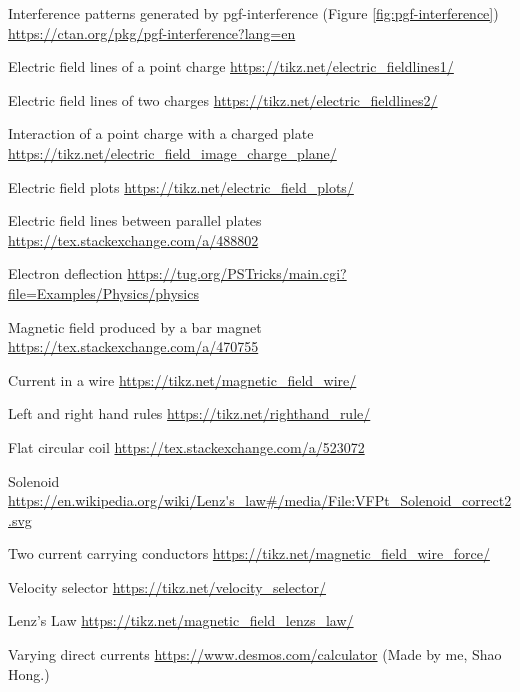 \begin{enumerate}[label={[\arabic*]}]
    \item\label{source:pgf-interference} Interference patterns generated by pgf-interference (Figure \ref{fig:pgf-interference}) \url{https://ctan.org/pkg/pgf-interference?lang=en}
    \item\label{Electric field lines of a point charge} Electric field lines of a point charge \url{https://tikz.net/electric_fieldlines1/}
    \item\label{Electric field lines of two charges} Electric field lines of two charges \url{https://tikz.net/electric_fieldlines2/}
    \item\label{Interaction of a point charge with a charged plate} Interaction of a point charge with a charged plate \url{https://tikz.net/electric_field_image_charge_plane/}
    \item\label{Electric field plots} Electric field plots \url{https://tikz.net/electric_field_plots/}
    \item\label{Electric field lines between parallel plates} Electric field lines between parallel plates \url{https://tex.stackexchange.com/a/488802}
    \item\label{Electron deflection} Electron deflection \url{https://tug.org/PSTricks/main.cgi?file=Examples/Physics/physics}
    \item\label{Magnetic field produced by a bar magnet} Magnetic field produced by a bar magnet \url{https://tex.stackexchange.com/a/470755} 
    \item\label{Current in a wire} Current in a wire \url{https://tikz.net/magnetic_field_wire/}
    \item\label{Left and right hand rules} Left and right hand rules \url{https://tikz.net/righthand_rule/}
    \item\label{Flat circular coil} Flat circular coil \url{https://tex.stackexchange.com/a/523072}
    \item\label{Solenoid} Solenoid \url{https://en.wikipedia.org/wiki/Lenz's_law#/media/File:VFPt_Solenoid_correct2.svg}
    \item\label{Two current carrying conductors} Two current carrying conductors \url{https://tikz.net/magnetic_field_wire_force/}
    \item\label{Velocity selector} Velocity selector \url{https://tikz.net/velocity_selector/}
    \item\label{Lenz's Law} Lenz's Law \url{https://tikz.net/magnetic_field_lenzs_law/}
    \item\label{Varying direct current} Varying direct currents \url{https://www.desmos.com/calculator} (Made by me, Shao Hong.)

\end{enumerate}
